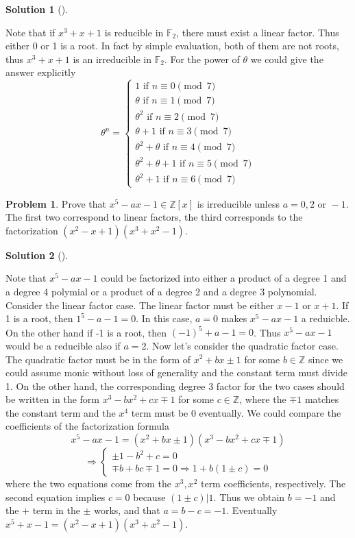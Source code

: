 \documentclass{article}
\theoremstyle{definition}
\newtheorem{prob}{Problem}
\newtheorem*{sol}{Solution}
\newenvironment{sols}[1][]{%
  \begin{sol}[#1]$ $\par\nobreak\ignorespaces
}{%
  \end{sol}
}
\begin{document}
\begin{sols}
	Note that if $x^3 + x + 1$ is reducible in $\mathbb{F}_2$, there must exist a linear factor.
	Thus either 0 or 1 is a root.
	In fact by simple evaluation, both of them are not roots, thus $x^3 + x + 1$ is an irreducible in $\mathbb{F}_2$.
	For the power of $\theta$ we could give the answer explicitly\\
	\[
		\theta^n = 
		\begin{cases}
			1 \text{ if } n \equiv 0 \pmod{7}\\
			\theta \text{ if } n \equiv 1 \pmod{7}\\
			\theta^2 \text{ if } n \equiv 2 \pmod{7}\\
			\theta + 1 \text{ if } n \equiv 3 \pmod{7}\\
			\theta^2 + \theta \text{ if } n \equiv 4 \pmod{7}\\
			\theta^2 + \theta + 1 \text{ if } n \equiv 5 \pmod{7}\\
			\theta^2 + 1 \text{ if } n \equiv 6 \pmod{7}
		\end{cases}
	\]
\end{sols}

\setcounter{prob}{7}
\begin{prob}
	Prove that $x^5 - ax - 1 \in \mathbb{Z}[x]$ is irreducible unless $a = 0, 2 \text{ or } -1$.
	The first two correspond to linear factors, the third corresponds to the factorization $(x^2 - x + 1)(x^3 + x^2 - 1)$.
\end{prob}

\begin{sols}
	Note that $x^5 - ax - 1$ could be factorized into either a product of a degree 1 and a degree 4 polymial or a product of a degree 2 and a degree 3 polynomial.
	Consider the linear factor case.
	The linear factor must be either $x - 1$ or $x + 1$.
	If 1 is a root, then $1^5 - a - 1 = 0$. 
	In this case, $a = 0$ makes $x^5 - ax - 1$  a reduicble.
	On the other hand if -1 is a root, then $(-1)^5 + a - 1 = 0$.
	Thus $x^5 - ax - 1$ would be a reducible also if $a = 2$.
	Now let's consider the quadratic factor case.
	The quadratic factor must be in the form of $x^2 + bx \pm 1$ for some $b \in \mathbb{Z}$ since we could assume monic without loss of generality and the constant term must divide 1.
	On the other hand, the corresponding degree 3 factor for the two cases should be written in the form $x^3 - bx^2 + cx \mp 1$ for some $c \in \mathbb{Z}$, where the $\mp 1$ matches the constant term and the $x^4$ term must be 0 eventually. 
	We could compare the coefficients of the factorization formula
	\[
		x^5 - ax - 1 = (x^2 + bx \pm 1)(x^3 - bx^2 + cx \mp 1)
	\]
	\[
		\Rightarrow 
		\begin{cases}
			\pm 1 - b^2 + c = 0\\
			\mp b + bc \mp 1 = 0 \Rightarrow 1 + b(1 \pm c) = 0
		\end{cases}
	\]
	where the two equations come from the $x^3, x^2$ term coefficients, respectively.
	The second equation implies $c = 0$ because $(1 \pm c)| 1$. 
	Thus we obtain $b = -1$ and the $+$ term in the $\pm$ works, and that $a = b - c = -1$.
	Eventually $x^5 + x - 1 = (x^2 - x + 1)(x^3 + x^2 - 1)$.
\end{sols}
\end{document}

